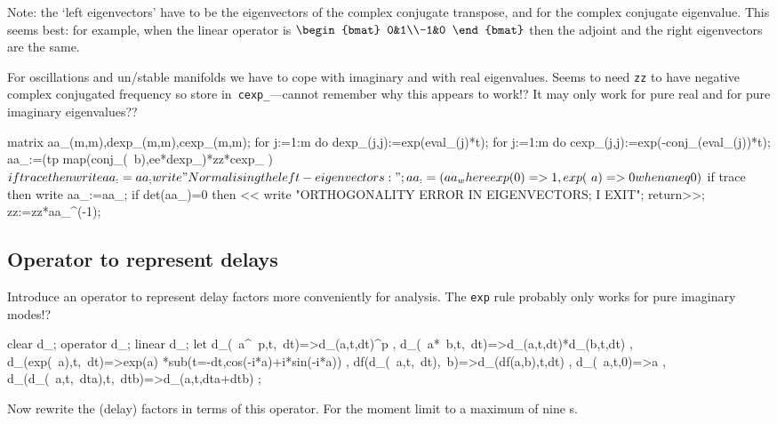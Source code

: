 \documentclass[11pt,a5paper]{article}
\begin{document}
Note: the `left eigenvectors' have to be the eigenvectors of
the complex conjugate transpose, and for the complex
conjugate eigenvalue. This seems best: for example, when the
linear operator is \(\begin{bmat} 0&1\\-1&0 \end{bmat}\)
then the adjoint and the right eigenvectors are the same.

For oscillations and un/stable manifolds we have to cope
with imaginary and with real eigenvalues. Seems to need
\verb|zz| to have negative complex conjugated frequency so
store in~\verb|cexp_|---cannot remember why this appears to
work!?  It may only work for pure real and for pure
imaginary eigenvalues??

\begin{reduce}
matrix aa_(m,m),dexp_(m,m),cexp_(m,m);
for j:=1:m do dexp_(j,j):=exp(eval_(j)*t);
for j:=1:m do cexp_(j,j):=exp(-conj_(eval_(j))*t); 
aa_:=(tp map(conj_(~b),ee*dexp_)*zz*cexp_ )$
if trace then write aa_:=aa_;
write "Normalising the left-eigenvectors:";
aa_:=(aa_ where {exp(0)=>1, exp(~a)=>0 when a neq 0})$
if trace then write aa_:=aa_;
if det(aa_)=0 then << write
    "ORTHOGONALITY ERROR IN EIGENVECTORS; I EXIT"; 
    return>>;
zz:=zz*aa_^(-1);
\end{reduce}


\subsection{Operator to represent delays}

Introduce an operator to represent delay factors more
conveniently for analysis.  The \verb|exp| rule probably
only works for pure imaginary modes!?
\begin{reduce}
clear d_; operator d_; linear d_;
let { d_(~a^~p,t,~dt)=>d_(a,t,dt)^p
    , d_(~a*~b,t,~dt)=>d_(a,t,dt)*d_(b,t,dt)
    , d_(exp(~a),t,~dt)=>exp(a)
        *sub(t=-dt,cos(-i*a)+i*sin(-i*a))
    , df(d_(~a,t,~dt),~b)=>d_(df(a,b),t,dt)
    , d_(~a,t,0)=>a
    , d_(d_(~a,t,~dta),t,~dtb)=>d_(a,t,dta+dtb)
    };
\end{reduce}

Now rewrite the (delay) factors in terms of this operator.
For the moment limit to a maximum of nine \ode{}s.
\end{document}
